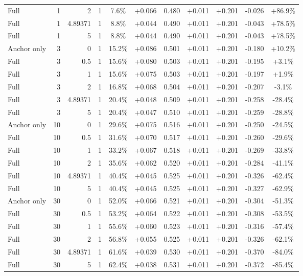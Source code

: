 \begin{table}[htbp]
\begin{tabular}{lrrrccccccc}
Full & 1 & 2 & 1 & 7.6\% & +0.066 & 0.480 & +0.011 & +0.201 & -0.026 & +86.9\% \\
Full & 1 & 4.89371 & 1 & 8.8\% & +0.044 & 0.490 & +0.011 & +0.201 & -0.043 & +78.5\% \\
Full & 1 & 5 & 1 & 8.8\% & +0.044 & 0.490 & +0.011 & +0.201 & -0.043 & +78.5\% \\
Anchor only & 3 & 0 & 1 & 15.2\% & +0.086 & 0.501 & +0.011 & +0.201 & -0.180 & +10.2\% \\
Full & 3 & 0.5 & 1 & 15.6\% & +0.080 & 0.503 & +0.011 & +0.201 & -0.195 & +3.1\% \\
Full & 3 & 1 & 1 & 15.6\% & +0.075 & 0.503 & +0.011 & +0.201 & -0.197 & +1.9\% \\
Full & 3 & 2 & 1 & 16.8\% & +0.068 & 0.504 & +0.011 & +0.201 & -0.207 & -3.1\% \\
Full & 3 & 4.89371 & 1 & 20.4\% & +0.048 & 0.509 & +0.011 & +0.201 & -0.258 & -28.4\% \\
Full & 3 & 5 & 1 & 20.4\% & +0.047 & 0.510 & +0.011 & +0.201 & -0.259 & -28.8\% \\
Anchor only & 10 & 0 & 1 & 29.6\% & +0.075 & 0.516 & +0.011 & +0.201 & -0.250 & -24.5\% \\
Full & 10 & 0.5 & 1 & 31.6\% & +0.070 & 0.517 & +0.011 & +0.201 & -0.260 & -29.6\% \\
Full & 10 & 1 & 1 & 33.2\% & +0.067 & 0.518 & +0.011 & +0.201 & -0.269 & -33.8\% \\
Full & 10 & 2 & 1 & 35.6\% & +0.062 & 0.520 & +0.011 & +0.201 & -0.284 & -41.1\% \\
Full & 10 & 4.89371 & 1 & 40.4\% & +0.045 & 0.525 & +0.011 & +0.201 & -0.326 & -62.4\% \\
Full & 10 & 5 & 1 & 40.4\% & +0.045 & 0.525 & +0.011 & +0.201 & -0.327 & -62.9\% \\
Anchor only & 30 & 0 & 1 & 52.0\% & +0.066 & 0.521 & +0.011 & +0.201 & -0.304 & -51.3\% \\
Full & 30 & 0.5 & 1 & 53.2\% & +0.064 & 0.522 & +0.011 & +0.201 & -0.308 & -53.5\% \\
Full & 30 & 1 & 1 & 55.6\% & +0.060 & 0.523 & +0.011 & +0.201 & -0.316 & -57.4\% \\
Full & 30 & 2 & 1 & 56.8\% & +0.055 & 0.525 & +0.011 & +0.201 & -0.326 & -62.1\% \\
Full & 30 & 4.89371 & 1 & 61.6\% & +0.039 & 0.530 & +0.011 & +0.201 & -0.370 & -84.0\% \\
Full & 30 & 5 & 1 & 62.4\% & +0.038 & 0.531 & +0.011 & +0.201 & -0.372 & -85.4\% \\

\end{tabular}
\end{table}
